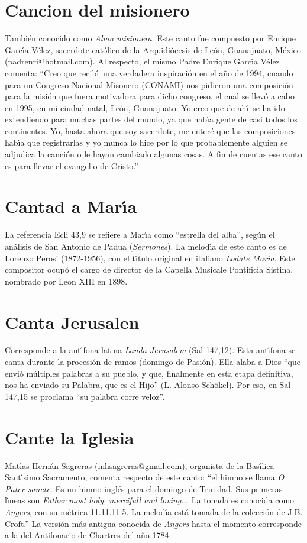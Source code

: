 \documentclass[landscape,12pt]{report}
\begin{document}
\section*{\small Cancion del misionero} \noindent Tambi\'en conocido como \textit{Alma misionera}. Este canto fue compuesto por Enrique Garc\'\i a V\'elez, sacerdote cat\'olico de la Arquidi\'ocesis de Le\'on, Guanajuato, M\'exico (padrenri@hotmail.com). Al respecto, el mismo Padre Enrique Garc\'\i a V\'elez comenta: ``Creo que recib\'\i\ una verdadera inspiraci\'on en el a\~no de 1994, cuando para un Congreso Nacional Misonero (CONAMI) nos pidieron una composici\'on para la misi\'on que fuera motivadora para dicho congreso, el cual se llev\'o a cabo en 1995, en mi ciudad natal, Le\'on, Guanajuato. Yo creo que de ah\'\i\ se ha ido extendiendo para muchas partes del mundo, ya que hab\'\i a gente de casi todos los continentes. Yo, hasta ahora que soy sacerdote, me enter\'e que las composiciones hab\'\i a que registrarlas y yo munca lo hice por lo que probablemente alguien se adjudica la canci\'on o le hayan cambiado algunas cosas. A fin de cuentas ese canto es para llevar el evangelio de Cristo.''
\section*{\small Cantad a Mar\'\i a} \noindent\footnotesize La referencia Ecli 43,9 se refiere a Mar\'\i a como ``estrella del alba'', seg\'un el an\'alisis de San Antonio de Padua (\textit{Sermones}). La melod\'\i a de este canto es de Lorenzo Perosi (1872-1956), con el t\'\i tulo original en italiano \emph{Lodate Maria}. Este compositor ocup\'o el cargo de director de la Capella Musicale Pontificia Sistina, nombrado por Leon XIII en 1898. 
\section*{\small Canta Jerusalen} \noindent\footnotesize Corresponde a la ant\'\i fona latina \textit{Lauda Jerusalem} (Sal 147,12). Esta ant\'\i fona se canta durante la procesi\'on de ramos (domingo de Pasi\'on). Ella alaba a Dios ``que envi\'o m\'ultiples palabras a su pueblo, y que, finalmente en esta etapa definitiva, nos ha enviado su Palabra, que es el Hijo'' (L. Alonso Sch\"okel). Por eso, en Sal 147,15 se proclama ``su palabra corre veloz''.  
\section*{\small Cante la Iglesia} \noindent\footnotesize Mat\'\i as Hern\'an Sagreras (mhsagreras@gmail.com), organista de la Bas\'\i lica Sant\'\i simo Sacramento, comenta respecto de este canto: ``el himno se llama \textit{O Pater sancte}. Es un himno ingl\'es para el domingo de Trinidad. Sus primeras l\'\i neas son \textit{Father most holy, mercifull and loving...} La tonada es conocida como \textit{Angers}, con su m\'etrica 11.11.11.5. La melod\'\i a est\'a tomada de la colecci\'on de J.B. Croft.'' La versi\'on m\'as antigua conocida de \textit{Angers} hasta el momento corresponde a la del Antifonario de Chartres del a\~no 1784.
\end{document}
